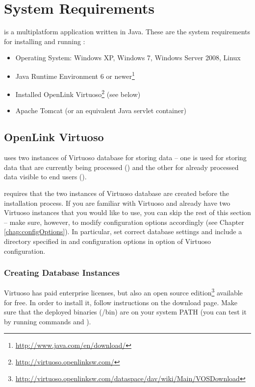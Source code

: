 \chapter{System Requirements}
\label{chap:requirements}
\odcs is a multiplatform application written in Java. These are the system requirements for installing and running \odcs:

\begin{itemize}
  \item Operating System: Windows XP, Windows 7, Windows Server 2008, Linux
  \item Java Runtime Environment 6 or newer\footnote{\url{http://www.java.com/en/download/}}
  \item Installed OpenLink Virtuoso\footnote{\url{http://virtuoso.openlinksw.com/}} (see below)
  \item Apache Tomcat (or an equivalent Java servlet container)
\end{itemize}


\section{OpenLink Virtuoso}
\label{sec:virtuoso}
\odcs uses two instances of Virtuoso database for storing data -- one is used for storing data that are currently being processed () and the other for already processed data visible to end users (). 

\odcs requires that the two instances of Virtuoso database are created before the installation process. If you are familiar with Virtuoso and already have two Virtuoso instances that you would like to use, you can skip the rest of this section -- make sure, however, to modify \odcs configuration options accordingly  (see Chapter \ref{chap:configOptions}). In particular, set correct database settings and include a directory specified in  and  configuration options in  option of Virtuoso configuration.

\subsection{Creating Database Instances}
Virtuoso has paid enterprise licenses, but also an open source edition\footnote{\url{http://virtuoso.openlinksw.com/dataspace/dav/wiki/Main/VOSDownload}} available for free. In order to install it, follow instructions on the download page. Make sure that the deployed binaries (/bin) are on your system PATH (you can test it by running commands  and ).

